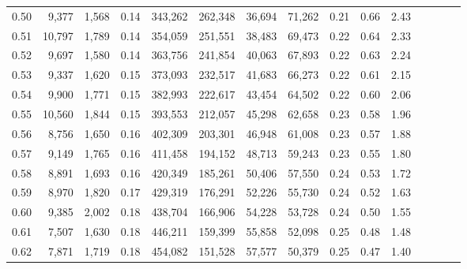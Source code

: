 \begin{tabular}{rrrcrrrrrrrrrrr}
0.50 &   9,377 &  1,568 &                                       0.14 &  343,262 &  262,348 &   36,694 &   71,262 &  0.21 &  0.66 &                         2.43 \\
0.51 &  10,797 &  1,789 &                                       0.14 &  354,059 &  251,551 &   38,483 &   69,473 &  0.22 &  0.64 &                         2.33 \\
0.52 &   9,697 &  1,580 &                                       0.14 &  363,756 &  241,854 &   40,063 &   67,893 &  0.22 &  0.63 &                         2.24 \\
0.53 &   9,337 &  1,620 &                                       0.15 &  373,093 &  232,517 &   41,683 &   66,273 &  0.22 &  0.61 &                         2.15 \\
0.54 &   9,900 &  1,771 &                                       0.15 &  382,993 &  222,617 &   43,454 &   64,502 &  0.22 &  0.60 &                         2.06 \\
0.55 &  10,560 &  1,844 &                                       0.15 &  393,553 &  212,057 &   45,298 &   62,658 &  0.23 &  0.58 &                         1.96 \\
0.56 &   8,756 &  1,650 &                                       0.16 &  402,309 &  203,301 &   46,948 &   61,008 &  0.23 &  0.57 &                         1.88 \\
0.57 &   9,149 &  1,765 &                                       0.16 &  411,458 &  194,152 &   48,713 &   59,243 &  0.23 &  0.55 &                         1.80 \\
0.58 &   8,891 &  1,693 &                                       0.16 &  420,349 &  185,261 &   50,406 &   57,550 &  0.24 &  0.53 &                         1.72 \\
0.59 &   8,970 &  1,820 &                                       0.17 &  429,319 &  176,291 &   52,226 &   55,730 &  0.24 &  0.52 &                         1.63 \\
0.60 &   9,385 &  2,002 &                                       0.18 &  438,704 &  166,906 &   54,228 &   53,728 &  0.24 &  0.50 &                         1.55 \\
0.61 &   7,507 &  1,630 &                                       0.18 &  446,211 &  159,399 &   55,858 &   52,098 &  0.25 &  0.48 &                         1.48 \\
0.62 &   7,871 &  1,719 &                                       0.18 &  454,082 &  151,528 &   57,577 &   50,379 &  0.25 &  0.47 &                         1.40 \\

\end{tabular}

